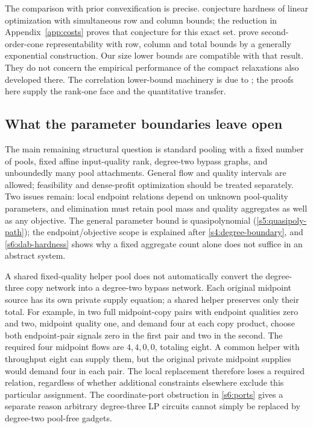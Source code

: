The comparison with prior convexification is precise.
\citet[Section~3.1, after Theorem~4]
{dey2020-convexifications-of-rank-one-based} conjecture hardness of linear
optimization with simultaneous row and column bounds; the reduction in
Appendix~\ref{app:costs} proves that conjecture for this exact set.
\citet[Theorem~2]{s6:jalilian2026} prove second-order-cone
representability with row, column and total bounds by a generally
exponential construction. Our size lower bounds are compatible with
that result. They do not concern the empirical performance of the
compact relaxations also developed there. The correlation lower-bound
machinery is due to \citet{s6:fawzi2013,s6:lrs-full,s6:bfps2015}; the
proofs here supply the rank-one face and the quantitative transfer.

\subsection{What the parameter boundaries leave open}\label{s6:open}
The main remaining structural question is standard pooling with a fixed
number of pools, fixed affine input-quality rank, degree-two bypass
graphs, and unboundedly many pool attachments. General flow and quality
intervals are allowed; feasibility and dense-profit optimization should
be treated separately. Two issues remain: local endpoint relations
depend on unknown pool-quality parameters, and elimination must retain
pool mass and quality aggregates as well as any objective. The general
parameter bound is quasipolynomial (\cref{s5:quasipoly-path}); the
endpoint/objective scope is explained after \cref{s4:degree-boundary},
and \cref{s6:slab-hardness} shows why a fixed aggregate count alone
does not suffice in an abstract system.

A shared fixed-quality helper pool does not automatically convert the
degree-three copy network into a degree-two bypass network. Each original
midpoint source has its own private supply equation; a shared helper
preserves only their total. For example, in two full midpoint-copy
pairs with endpoint qualities zero and two, midpoint quality one,
and demand four at each copy product, choose both endpoint-pair signals
zero in the first pair and two in the second. The required four midpoint
flows are $4,4,0,0$, totaling eight. A common helper with throughput eight
can supply them, but the original private midpoint supplies would demand
four in each pair. The local replacement therefore loses a required
relation, regardless of whether additional constraints elsewhere exclude
this particular assignment. The coordinate-port obstruction in
\cref{s6:ports} gives a separate reason arbitrary degree-three LP circuits
cannot simply be replaced by degree-two pool-free gadgets.

